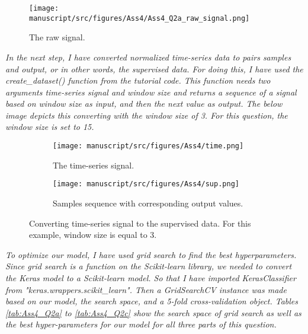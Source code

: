 \begin{figure}[H]
    \centering
    \begin{minipage}[b]{1\textwidth}
        \texttt{[image: manuscript/src/figures/Ass4/Ass4\_Q2a\_raw\_signal.png]}
    \end{minipage}
    \caption{The raw signal.}
    \label{fig:Ass4_Q2a_raw_signal}
\end{figure}

\textit{In the next step, I have converted normalized time-series data to pairs samples and output, or in other words, the supervised data. For doing this, I have used the create\_dataset() function from the tutorial code. This function needs two arguments time-series signal and window size and returns a sequence of a signal based on window size as input, and then the next value as output. The below image depicts this converting with the window size of 3. For this question, the window size is set to 15.}

\begin{figure}[H]
     \centering
     \begin{subfigure}[b]{0.55\textwidth}
         \centering
         \texttt{[image: manuscript/src/figures/Ass4/time.png]}
         \caption{The time-series signal.}
         \label{fig:ROC_all}
     \end{subfigure}
     \vfill
     \begin{subfigure}[b]{.25\textwidth}
         \centering
         \texttt{[image: manuscript/src/figures/Ass4/sup.png]}
         \caption{Samples sequence with corresponding output values.}
         \label{fig:ROC_fcn}
     \end{subfigure} 
        \caption{Converting time-series signal to the supervised data. For this example, window size is equal to 3. }
        \label{fig:ROC}
\end{figure}

\textit{To optimize our model, I have used grid search to find the best hyperparameters. Since grid search is a function on the Scikit-learn library, we needed to convert the Keras model to a Scikit-learn model. So that I have imported KerasClassifier from "keras.wrappers.scikit\_learn". Then a GridSearchCV instance was made based on our model, the search space, and a 5-fold cross-validation object. Tables \ref{tab:Ass4_Q2a} to \ref{tab:Ass4_Q2c} show the search space of grid search as well as the best hyper-parameters for our model for all three parts of this question.}


